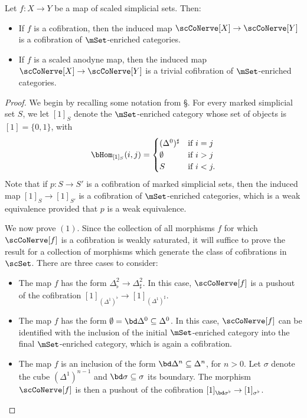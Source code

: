 \begin{proposition}\label{presus}
Let $f: X \rightarrow Y$ be a map of scaled simplicial sets. Then:
\begin{itemize}
\item[$(1)$] If $f$ is a cofibration, then the induced map $\scCoNerve[X] \rightarrow
\scCoNerve[Y]$ is a cofibration of $\mSet$-enriched categories.
\item[$(2)$] If $f$ is a scaled anodyne map, then the induced map
$\scCoNerve[X] \rightarrow \scCoNerve[Y]$ is a trivial cofibration of
$\mSet$-enriched categories.
\end{itemize}
\end{proposition}

\begin{proof}
We begin by recalling some notation from \S {}. For every marked simplicial
set $S$, we let $[1]_{S}$ denote the $\mSet$-enriched category whose set of objects is
$[1] = \{0, 1\}$, with
$$ \bHom_{ [1]_{S} }(i, j) = \begin{cases} ( \Delta^0)^{\sharp} & \text{if } i = j \\
\emptyset & \text{if } i > j \\
S & \text{if } i < j. \end{cases}$$
Note that if $p: S \rightarrow S'$ is a cofibration of marked simplicial sets, then
the induced map $[1]_{S} \rightarrow [1]_{S'}$ is a cofibration of $\mSet$-enriched categories,
which is a weak equivalence provided that $p$ is a weak equivalence.

We now prove $(1)$. Since the collection of all morphisms $f$ for which $\scCoNerve[f]$ is 
a cofibration is weakly saturated, it will suffice to prove the result for a collection of morphisms
which generate the class of cofibrations in $\scSet$. There are three cases to consider:

\begin{itemize}
\item[$(a)$] The map $f$ has the form $\Delta^2_{\flat} \rightarrow \Delta^2_{\sharp}$. In
this case, $\scCoNerve[f]$ is a pushout of the cofibration
$[1]_{ (\Delta^1)^{\flat} } \rightarrow [1]_{ ( \Delta^1)^{\sharp} }.$
\item[$(b)$] The map $f$ has the form $\emptyset = \bd \Delta^0 \subseteq \Delta^0$. 
In this case, $\scCoNerve[f]$ can be identified with the inclusion of the initial
$\mSet$-enriched category into the final $\mSet$-enriched category, which is again a cofibration.
\item[$(c)$] The map $f$ is an inclusion of the form $\bd \Delta^n \subseteq \Delta^n$, for $n > 0$.
Let $\sigma$ denote the cube $( \Delta^1)^{n-1}$ and $\bd \sigma \subseteq \sigma$ its boundary.
The morphism $\scCoNerve[f]$ is then a pushout of the cofibration
$[1]_{ \bd \sigma^{\flat} } \rightarrow [1]_{ \sigma^{\flat} }$.
\end{itemize}


\end{proof}
